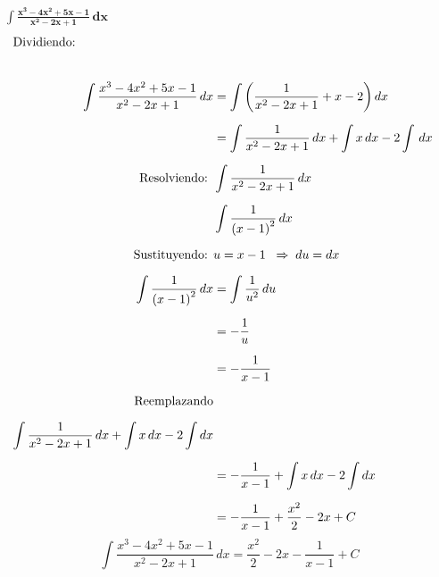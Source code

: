 $\displaystyle \mathbf{\int \frac{x^{3} - 4x^{2} + 5x - 1}{x^{2} - 2x + 1} \, dx}$
\nopagebreak
\begin{align*}
\intertext{Dividiendo:} \\[4pt]
\int \frac{x^{3} - 4x^{2} + 5x - 1}{x^{2} - 2x + 1} \, dx
&= \int \left(\frac{1}{x^{2} - 2x + 1} + x - 2\right) dx\\[6pt]
&= \int \frac{1}{x^{2} - 2x + 1} \, dx + \int x \, dx - 2 \int \, dx\\[6pt]
\text{Resolviendo: }&\int \frac{1}{x^{2} - 2x + 1} \, dx \\[6pt]
&\int \frac{1}{\left(x - 1\right)^{2}} \, dx\\[6pt]
\text{Sustituyendo: } &u = x - 1 
\;\;\Rightarrow\; du = dx \\[6pt]
\int \frac{1}{\left(x - 1\right)^{2}} \, dx
&= \int \frac{1}{u^{2}} \, du\\[6pt]
&= -\frac{1}{u}\\[6pt]
&= -\frac{1}{x - 1}\\[6pt]
\text{Reemplazando}\\[6pt]
\int \frac{1}{x^{2} - 2x + 1} \, dx + \int x \, dx - 2 \int dx\\[6pt]
&= -\frac{1}{x - 1} + \int x \, dx - 2 \int dx\\[6pt]
&= -\frac{1}{x - 1} + \frac{x^{2}}{2} - 2x  + C
\end{align*}
\[
\boxed{\displaystyle 
\int \frac{x^{3} - 4x^{2} + 5x - 1}{x^{2} - 2x + 1} \, dx
= \frac{x^{2}}{2} - 2x - \frac{1}{x - 1} + C
}
\]
